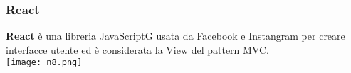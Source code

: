 \begin{frame}
\frametitle{React}
	\par
  	\textbf{React} è una libreria JavaScriptG usata da Facebook e 			Instangram per creare interfacce
	utente ed è considerata la View del pattern MVC.\\
	\centering
  	\texttt{[image: n8.png]}
\end{frame}


